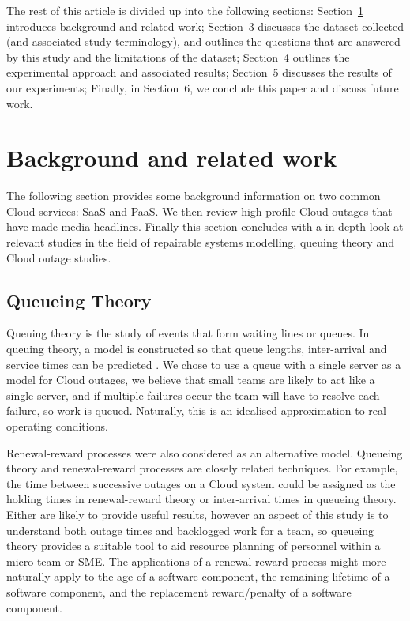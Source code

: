 \documentclass[5p]{elsarticle}
\begin{document}
The rest of this article is divided up into the following sections: Section~\ref{sec:background} introduces background and related work; Section~3 discusses the dataset collected (and associated study terminology), and outlines the questions that are answered by this study and the limitations of the dataset; Section~4 outlines the experimental approach and associated results; Section~5 discusses the results of our experiments; Finally, in Section~6, we conclude this paper and discuss future work.

\section{Background and related work}
\label{sec:background}

The following section provides some background information on two common Cloud services: SaaS and PaaS. We then review high-profile Cloud outages that have made media headlines. Finally this section concludes with a in-depth look at relevant studies in the field of repairable systems modelling, queuing theory and Cloud outage studies.

\subsection{Queueing Theory}

Queuing theory is the study of events that form waiting lines or queues. In queuing theory, a model is constructed so that queue lengths, inter-arrival and service times can be predicted \cite{kleinrock1975queuing, gross2008fundamentals, sundarapandian2009probability}. We chose to use a queue with a single server as a model for Cloud outages, we believe that small teams are likely to act like a single server, and if multiple failures occur the team will have to resolve each failure, so work is queued. Naturally, this is an idealised approximation to real operating conditions.

Renewal-reward processes \cite{blackwell1948renewal,jewell1967simple} were  also considered as an alternative model. Queueing theory and renewal-reward processes are closely related techniques.  For example, the time between successive outages on a Cloud system could be assigned as the holding times in renewal-reward theory or inter-arrival times in queueing theory. Either are likely to provide useful results, however an aspect of this study is to understand both outage times and backlogged work for a team, so queueing theory provides a suitable tool to aid resource planning of personnel within a micro team or SME.  The applications of a renewal reward process might more naturally apply to the age of a software component, the remaining lifetime of a software component, and the replacement reward/penalty of a software component.
\end{document}
